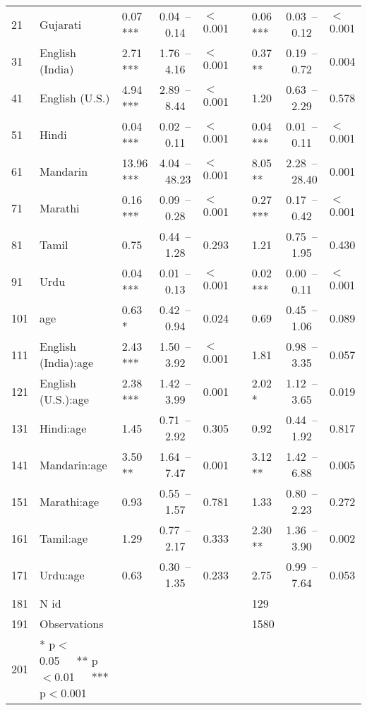 \begin{table}[ht]
\begin{tabular}{}
  21 & Gujarati & 0.07 *** & 0.04 – 0.14 & $<$0.001 &  & 0.06 *** & 0.03 – 0.12 & $<$0.001 \\ 
  31 & English (India) & 2.71 *** & 1.76 – 4.16 & $<$0.001 &  & 0.37 ** & 0.19 – 0.72 & 0.004 \\ 
  41 & English (U.S.) & 4.94 *** & 2.89 – 8.44 & $<$0.001 &  & 1.20 & 0.63 – 2.29 & 0.578 \\ 
  51 & Hindi & 0.04 *** & 0.02 – 0.11 & $<$0.001 &  & 0.04 *** & 0.01 – 0.11 & $<$0.001 \\ 
  61 & Mandarin & 13.96 *** & 4.04 – 48.23 & $<$0.001 &  & 8.05 ** & 2.28 – 28.40 & 0.001 \\ 
  71 & Marathi & 0.16 *** & 0.09 – 0.28 & $<$0.001 &  & 0.27 *** & 0.17 – 0.42 & $<$0.001 \\ 
  81 & Tamil & 0.75 & 0.44 – 1.28 & 0.293 &  & 1.21 & 0.75 – 1.95 & 0.430 \\ 
  91 & Urdu & 0.04 *** & 0.01 – 0.13 & $<$0.001 &  & 0.02 *** & 0.00 – 0.11 & $<$0.001 \\ 
  101 & age & 0.63 * & 0.42 – 0.94 & 0.024 &  & 0.69 & 0.45 – 1.06 & 0.089 \\ 
  111 & English (India):age & 2.43 *** & 1.50 – 3.92 & $<$0.001 &  & 1.81 & 0.98 – 3.35 & 0.057 \\ 
  121 & English (U.S.):age & 2.38 *** & 1.42 – 3.99 & 0.001 &  & 2.02 * & 1.12 – 3.65 & 0.019 \\ 
  131 & Hindi:age & 1.45 & 0.71 – 2.92 & 0.305 &  & 0.92 & 0.44 – 1.92 & 0.817 \\ 
  141 & Mandarin:age & 3.50 ** & 1.64 – 7.47 & 0.001 &  & 3.12 ** & 1.42 – 6.88 & 0.005 \\ 
  151 & Marathi:age & 0.93 & 0.55 – 1.57 & 0.781 &  & 1.33 & 0.80 – 2.23 & 0.272 \\ 
  161 & Tamil:age & 1.29 & 0.77 – 2.17 & 0.333 &  & 2.30 ** & 1.36 – 3.90 & 0.002 \\ 
  171 & Urdu:age & 0.63 & 0.30 – 1.35 & 0.233 &  & 2.75 & 0.99 – 7.64 & 0.053 \\ 
  181 & N id &  &  &  &  & 129 &  &  \\ 
  191 & Observations &  &  &  &  & 1580 &  &  \\ 
  201 & * p$<$0.05   ** p$<$0.01   *** p$<$0.001 &  &  &  &  &  &  &  \\ 
   \hline
\end{tabular}
\end{table}
